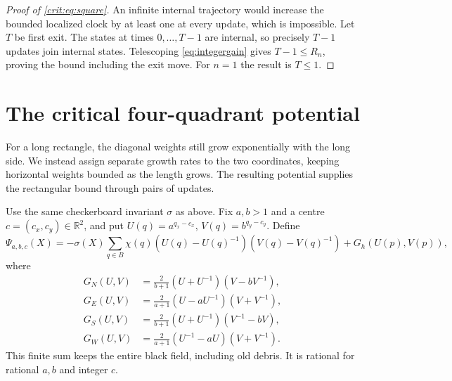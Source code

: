\documentclass[11pt,a4paper]{article}
\theoremstyle{remark}\newtheorem{remark}[theorem]{Remark}
\newcommand{\R}{\mathbb R}\newcommand{\PhiC}{\Psi_{a,b,c}}
\begin{document}
\begin{proof}[Proof of \eqref{crit:eq:square}]
An infinite internal trajectory would increase the bounded localized clock
by at least one at every update, which is impossible. Let $T$ be first exit.
The states at times $0,\ldots,T-1$ are internal, so precisely $T-1$ updates
join internal states. Telescoping \eqref{eq:integergain} gives
$T-1\le R_n$, proving the bound including the exit move.
For $n=1$ the result is $T\le1$.
\end{proof}

\section{The critical four-quadrant potential}
For a long rectangle, the diagonal weights still grow exponentially with the
long side. We instead assign separate growth rates to the two coordinates,
keeping horizontal weights bounded as the length grows. The resulting
potential supplies the rectangular bound through pairs of updates.

Use the same checkerboard invariant $\sigma$ as above. Fix $a,b>1$ and a centre $c=(c_x,c_y)\in\R^2$, and put
$U(q)=a^{q_x-c_x}$, $V(q)=b^{q_y-c_y}$. Define
\begin{equation}\label{crit:eq:potential}
 \PhiC(X)=-\sigma(X)\sum_{q\in B}\chi(q)
 (U(q)-U(q)^{-1})(V(q)-V(q)^{-1})+G_h(U(p),V(p)),
\end{equation}
where
\begin{align*}
 G_N(U,V)&=\frac2{b+1}(U+U^{-1})(V-bV^{-1}),\\
 G_E(U,V)&=\frac2{a+1}(U-aU^{-1})(V+V^{-1}),\\
 G_S(U,V)&=\frac2{b+1}(U+U^{-1})(V^{-1}-bV),\\
 G_W(U,V)&=\frac2{a+1}(U^{-1}-aU)(V+V^{-1}).
\end{align*}
This finite sum keeps the entire black field, including old debris. It is
rational for rational $a,b$ and integer $c$.
\end{document}
